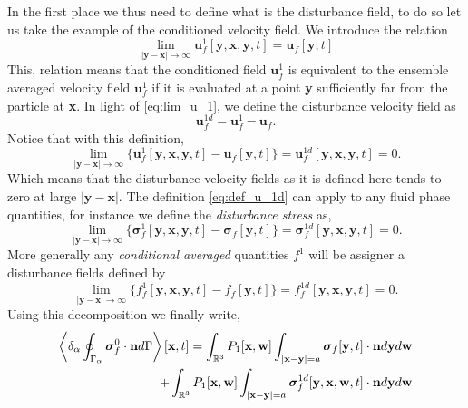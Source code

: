 In the first place we thus need to define what is the disturbance field, to do so let us take the example of the conditioned velocity field.
We introduce the relation 
\begin{equation}
    \lim_{|\textbf{y}-\textbf{x}|\to\infty} 
    \textbf{u}_f^1[\textbf{y},\textbf{x},\textbf{y},t]
    =
    \textbf{u}_f[\textbf{y},t]
    \label{eq:lim_u_1}
\end{equation} 
This, relation means that the conditioned field $\textbf{u}_f^1$ is equivalent to the ensemble averaged velocity field $\textbf{u}_f^1$ if it is evaluated at a point \textbf{y} sufficiently far from the particle at \textbf{x}. 
In light of \ref{eq:lim_u_1}, we define the disturbance velocity field as 
\begin{equation*}
    \textbf{u}_f^{1d}
    =
    \textbf{u}_f^1 
    - 
    \textbf{u}_f. 
    \label{eq:def_u_1d}
\end{equation*}
Notice that with this definition, 
\begin{equation*}
    \lim_{|\textbf{y}-\textbf{x}|\to\infty} 
    \{\textbf{u}_f^1[\textbf{y},\textbf{x},\textbf{y},t]
    - \textbf{u}_f[\textbf{y},t]\}
    =
    \textbf{u}_f^{1d}[\textbf{y},\textbf{x},\textbf{y},t]
    = 0.
    \label{eq:lim_u_1d}
\end{equation*} 
Which means that the disturbance velocity fields as it is defined here tends to zero at large $|\textbf{y} - \textbf{x}|$.
The definition \ref{eq:def_u_1d} can apply to any fluid phase quantities,
for instance we define the \textit{disturbance stress} as,
\begin{equation*}
    \lim_{|\textbf{y}-\textbf{x}|\to\infty} 
    \{\bm\sigma_f^1[\textbf{y},\textbf{x},\textbf{y},t]
    - \bm\sigma_f[\textbf{y},t]\}
    =
    \bm\sigma_f^{1d}[\textbf{y},\textbf{x},\textbf{y},t]
    = 0.
\end{equation*} 
More generally any \textit{conditional averaged} quantities $f^1$ will be assigner a disturbance fields defined by 
\begin{equation*}
    \lim_{|\textbf{y}-\textbf{x}|\to\infty} 
    \{f_f^1[\textbf{y},\textbf{x},\textbf{y},t]
    - f_f[\textbf{y},t]\}
    =
    f_f^{1d}[\textbf{y},\textbf{x},\textbf{y},t]
    = 0.
\end{equation*} 
Using this decomposition we finally write, 
\begin{align*}
    \left<\delta_\alpha \oint_{\Gamma_{\alpha}} \bm\sigma_f^0\cdot\textbf{n} d\Gamma\right>[\textbf{x},t]
    =
    \int_{\mathbb{R}^3}
    P_1[\textbf{x},\textbf{w}]
    \int_{|\textbf{x}-\textbf{y}|=a}
    \bm\sigma_f[\textbf{y},t]
    \cdot \textbf{n}
    d\textbf{y}
    d\textbf{w}\\
    + 
    \int_{\mathbb{R}^3}
    P_1[\textbf{x},\textbf{w}]
    \int_{|\textbf{x}-\textbf{y}|=a}
    \bm\sigma_f^{1d}[\textbf{y},\textbf{x},\textbf{w},t]
    \cdot \textbf{n}
    d\textbf{y}
    d\textbf{w}
\end{align*}
